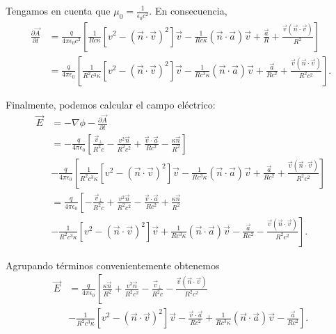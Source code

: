 \documentclass[12pt,a4paper]{book}
\begin{document}
Tengamos en cuenta que $\mu_0 = \frac{1}{\epsilon_0 c^2}$. En consecuencia,
\begin{align}
\frac{\partial\vec{A}}{\partial t} &= \frac{q}{4\pi\epsilon_0 c^2}\left[\frac{1}{Rc\kappa}[v^2 - (\vec{n} \cdot \vec{v})^2]\vec{v} - \frac{1}{Rc\kappa}(\vec{n} \cdot \vec{a})\vec{v} + \frac{\vec{a}}{R} + \frac{\vec{v}(\vec{n} \cdot \vec{v})}{R^2}\right] \nonumber \\
&= \frac{q}{4\pi\epsilon_0}\left[\frac{1}{R^2c^3\kappa}[v^2 - (\vec{n} \cdot \vec{v})^2]\vec{v} - \frac{1}{Rc^3\kappa}(\vec{n} \cdot \vec{a})\vec{v} + \frac{\vec{a}}{Rc^2} + \frac{\vec{v}(\vec{n} \cdot \vec{v})}{R^2c^2}\right].
\end{align}

Finalmente, podemos calcular el campo eléctrico:
\begin{align}
\vec{E} &= -\nabla\phi - \frac{\partial\vec{A}}{\partial t} \nonumber \\
&= -\frac{q}{4\pi\epsilon_0}\left[\frac{\vec{v}_{\perp}}{R^2c} - \frac{v^2\vec{n}}{R^2c^2} + \frac{\vec{v} \cdot \vec{a}}{Rc^2} - \frac{\kappa\vec{n}}{R^2}\right] \nonumber \\
&- \frac{q}{4\pi\epsilon_0}\left[\frac{1}{R^2c^3\kappa}[v^2 - (\vec{n} \cdot \vec{v})^2]\vec{v} - \frac{1}{Rc^3\kappa}(\vec{n} \cdot \vec{a})\vec{v} + \frac{\vec{a}}{Rc^2} + \frac{\vec{v}(\vec{n} \cdot \vec{v})}{R^2c^2}\right] \nonumber \\
&= \frac{q}{4\pi\epsilon_0}\left[-\frac{\vec{v}_{\perp}}{R^2c} + \frac{v^2\vec{n}}{R^2c^2} - \frac{\vec{v} \cdot \vec{a}}{Rc^2} + \frac{\kappa\vec{n}}{R^2} \right. \nonumber \\
&\left. -\frac{1}{R^2c^3\kappa}[v^2 - (\vec{n} \cdot \vec{v})^2]\vec{v} + \frac{1}{Rc^3\kappa}(\vec{n} \cdot \vec{a})\vec{v} - \frac{\vec{a}}{Rc^2} - \frac{\vec{v}(\vec{n} \cdot \vec{v})}{R^2c^2}\right].
\end{align}

Agrupando términos convenientemente obtenemos
\begin{align}
\vec{E} &= \frac{q}{4\pi\epsilon_0}\left[\frac{\kappa\vec{n}}{R^2} + \frac{v^2\vec{n}}{R^2c^2} - \frac{\vec{v}_{\perp}}{R^2c} - \frac{\vec{v}(\vec{n} \cdot \vec{v})}{R^2c^2} \right. \nonumber \\
&\left. -\frac{1}{R^2c^3\kappa}[v^2 - (\vec{n} \cdot \vec{v})^2]\vec{v} - \frac{\vec{v} \cdot \vec{a}}{Rc^2} + \frac{1}{Rc^3\kappa}(\vec{n} \cdot \vec{a})\vec{v} - \frac{\vec{a}}{Rc^2}\right].
\end{align}
\end{document}
